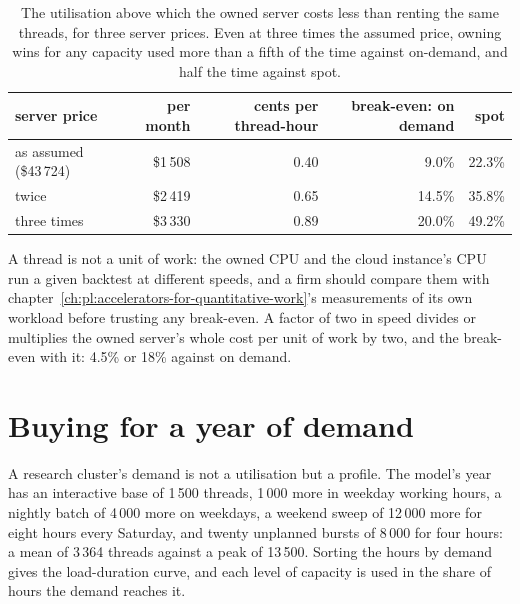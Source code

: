 \begin{table}[htbp]
\centering\small
\begin{tabular}{lrrrr}
\toprule
server price & per month & cents per thread-hour & break-even: on demand & spot\\
\midrule
as assumed (\$43\,724) & \$1\,508 & 0.40 & 9.0\% & 22.3\%\\
twice & \$2\,419 & 0.65 & 14.5\% & 35.8\%\\
three times & \$3\,330 & 0.89 & 20.0\% & 49.2\%\\
\bottomrule
\end{tabular}
\caption{The utilisation above which the owned server costs less than renting the same threads, for three server prices. Even at three times
the assumed price, owning wins for any capacity used more than a fifth of the time against on-demand, and half the time against spot.}
\label{tab:pl:cloud-against-on-premises:break-even}
\end{table}

A thread is not a unit of work: the owned CPU and the cloud instance's CPU run a given backtest at different speeds, and a firm should compare
them with chapter~\ref{ch:pl:accelerators-for-quantitative-work}'s measurements of its own workload before trusting any break-even.
A factor of two in speed divides or multiplies the owned server's whole cost per unit of work by two, and the break-even with it: 4.5\% or
18\% against on demand.

\section{Buying for a year of demand}

A research cluster's demand is not a utilisation but a profile. The model's year has an interactive base of 1\,500 threads, 1\,000 more in
weekday working hours, a nightly batch of 4\,000 more on weekdays, a weekend sweep of 12\,000 more for eight hours every Saturday, and twenty
unplanned bursts of 8\,000 for four hours: a mean of 3\,364 threads against a peak of 13\,500. Sorting the hours by demand gives the load-duration
curve, and each level of capacity is used in the share of hours the demand reaches it.

\label{lst:pl:cloud-against-on-premises:plan}

